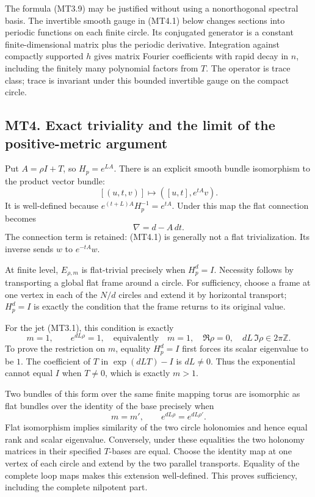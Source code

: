 The formula (MT3.9) may be justified without using a nonorthogonal
spectral basis. The invertible smooth gauge in (MT4.1) below changes
sections into periodic functions on each finite circle. Its conjugated
generator is a constant finite-dimensional matrix plus the periodic
derivative. Integration against compactly supported \(h\) gives matrix
Fourier coefficients with rapid decay in \(n\), including the finitely
many polynomial factors from \(T\). The operator is trace class; trace
is invariant under this bounded invertible gauge on the compact circle.

\subsection{MT4. Exact triviality and the limit of the positive-metric
argument}\label{mt4.-exact-triviality-and-the-limit-of-the-positive-metric-argument}

Put \(A=\rho I+T\), so \(H_p=e^{LA}\). There is an explicit smooth
bundle isomorphism to the product vector bundle: \[
 [(u,t,v)]\longmapsto
       ([u,t],e^{tA}v).
\tag{MT4.1}
\] It is well-defined because \(e^{(t+L)A}H_p^{-1}=e^{tA}\). Under this
map the flat connection becomes \[
 \nabla=d-A\,dt.
\tag{MT4.2}
\] The connection term is retained: (MT4.1) is generally not a flat
trivialization. Its inverse sends \(w\) to \(e^{-tA}w\).

At finite level, \(E_{\rho,m}\) is flat-trivial precisely when
\(H_p^d=I\). Necessity follows by transporting a global flat frame
around a circle. For sufficiency, choose a frame at one vertex in each
of the \(N/d\) circles and extend it by horizontal transport;
\(H_p^d=I\) is exactly the condition that the frame returns to its
original value.

For the jet (MT3.1), this condition is exactly \[
 m=1,\qquad e^{dL\rho}=1,
\quad\text{equivalently}\quad
 m=1,\quad \Re\rho=0,\quad dL\,\Im\rho\in2\pi\mathbb Z.
\tag{MT4.3}
\] To prove the restriction on \(m\), equality \(H_p^d=I\) first forces
its scalar eigenvalue to be \(1\). The coefficient of \(T\) in
\(\exp(dLT)-I\) is \(dL\ne0\). Thus the exponential cannot equal \(I\)
when \(T\ne0\), which is exactly \(m>1\).

Two bundles of this form over the same finite mapping torus are
isomorphic as flat bundles over the identity of the base precisely when
\[
 m=m',\qquad e^{dL\rho}=e^{dL\rho'}.
\tag{MT4.4}
\] Flat isomorphism implies similarity of the two circle holonomies and
hence equal rank and scalar eigenvalue. Conversely, under these
equalities the two holonomy matrices in their specified \(T\)-bases are
equal. Choose the identity map at one vertex of each circle and extend
by the two parallel transports. Equality of the complete loop maps makes
this extension well-defined. This proves sufficiency, including the
complete nilpotent part.

